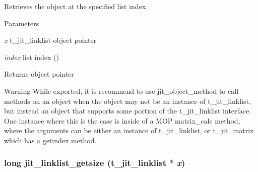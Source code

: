 Retrieves the object at the specified list index. 
\begin{DoxyParams}{Parameters}
\item[{\em x}]t\_\-jit\_\-linklist object pointer \item[{\em index}]list index ()\end{DoxyParams}
\begin{DoxyReturn}{Returns}
object pointer
\end{DoxyReturn}
\begin{DoxyWarning}{Warning}
While exported, it is recommend to use jit\_\-object\_\-method to call methods on an object when the object may not be an instance of t\_\-jit\_\-linklist, but instead an object that supports some portion of the t\_\-jit\_\-linklist interface. One instance where this is the case is inside of a MOP matrix\_\-calc method, where the arguments can be either an instance of t\_\-jit\_\-linklist, or t\_\-jit\_\-matrix which has a getindex method. 
\end{DoxyWarning}
\hypertarget{group__linklistmod_gaab0a8e1a6848d0d6713d703ebe7b9427}{
\subsubsection[{jit\_\-linklist\_\-getsize}]{\setlength{\rightskip}{0pt plus 5cm}long jit\_\-linklist\_\-getsize (t\_\-jit\_\-linklist $\ast$ {\em x})}}
\label{group__linklistmod_gaab0a8e1a6848d0d6713d703ebe7b9427}


